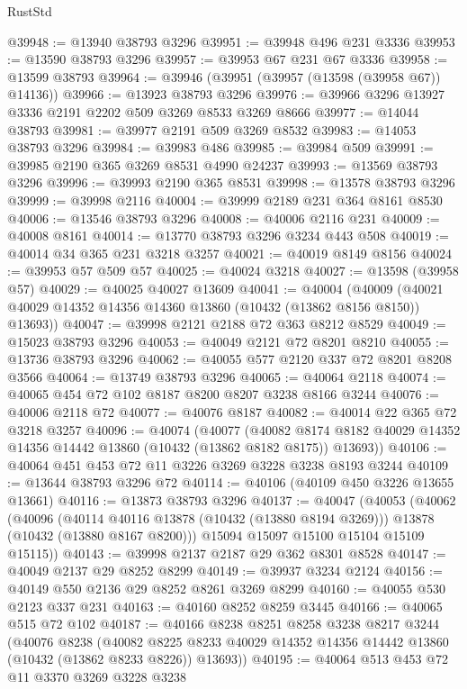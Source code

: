 \begin{lexlean}{RustStd}
\begin{coremodule}
@39948 := @13940 @38793 @3296
@39951 := @39948 @496 @231 @3336
@39953 := @13590 @38793 @3296
@39957 := @39953 @67 @231 @67 @3336
@39958 := @13599 @38793
@39964 := @39946 (@39951 (@39957 (@13598 (@39958 @67)) @14136))
@39966 := @13923 @38793 @3296
@39976 := @39966 @3296 @13927 @3336 @2191 @2202 @509 @3269 @8533 @3269 @8666
@39977 := @14044 @38793
@39981 := @39977 @2191 @509 @3269 @8532
@39983 := @14053 @38793 @3296
@39984 := @39983 @486
@39985 := @39984 @509
@39991 := @39985 @2190 @365 @3269 @8531 @4990 @24237
@39993 := @13569 @38793 @3296
@39996 := @39993 @2190 @365 @8531
@39998 := @13578 @38793 @3296
@39999 := @39998 @2116
@40004 := @39999 @2189 @231 @364 @8161 @8530
@40006 := @13546 @38793 @3296
@40008 := @40006 @2116 @231
@40009 := @40008 @8161
@40014 := @13770 @38793 @3296 @3234 @443 @508
@40019 := @40014 @34 @365 @231 @3218 @3257
@40021 := @40019 @8149 @8156
@40024 := @39953 @57 @509 @57
@40025 := @40024 @3218
@40027 := @13598 (@39958 @57)
@40029 := @40025 @40027 @13609
@40041 := @40004
    (@40009 (@40021 @40029 @14352 @14356 @14360 @13860 (@10432 (@13862 @8156 @8150)) @13693))
@40047 := @39998 @2121 @2188 @72 @363 @8212 @8529
@40049 := @15023 @38793 @3296
@40053 := @40049 @2121 @72 @8201 @8210
@40055 := @13736 @38793 @3296
@40062 := @40055 @577 @2120 @337 @72 @8201 @8208 @3566
@40064 := @13749 @38793 @3296
@40065 := @40064 @2118
@40074 := @40065 @454 @72 @102 @8187 @8200 @8207 @3238 @8166 @3244
@40076 := @40006 @2118 @72
@40077 := @40076 @8187
@40082 := @40014 @22 @365 @72 @3218 @3257
@40096 := @40074
    (@40077
      (@40082 @8174 @8182 @40029 @14352 @14356 @14442 @13860 (@10432 (@13862 @8182 @8175)) @13693))
@40106 := @40064 @451 @453 @72 @11 @3226 @3269 @3228 @3238 @8193 @3244
@40109 := @13644 @38793 @3296 @72
@40114 := @40106 (@40109 @450 @3226 @13655 @13661)
@40116 := @13873 @38793 @3296
@40137 := @40047
    (@40053
      (@40062
        (@40096
          (@40114 @40116 @13878 (@10432 (@13880 @8194 @3269)))
          @13878
          (@10432 (@13880 @8167 @8200)))
        @15094
        @15097
        @15100
        @15104
        @15109
        @15115))
@40143 := @39998 @2137 @2187 @29 @362 @8301 @8528
@40147 := @40049 @2137 @29 @8252 @8299
@40149 := @39937 @3234 @2124
@40156 := @40149 @550 @2136 @29 @8252 @8261 @3269 @8299
@40160 := @40055 @530 @2123 @337 @231
@40163 := @40160 @8252 @8259 @3445
@40166 := @40065 @515 @72 @102
@40187 := @40166
    @8238
    @8251
    @8258
    @3238
    @8217
    @3244
    (@40076
      @8238
      (@40082 @8225 @8233 @40029 @14352 @14356 @14442 @13860 (@10432 (@13862 @8233 @8226)) @13693))
@40195 := @40064 @513 @453 @72 @11 @3370 @3269 @3228 @3238

\end{coremodule}
\end{lexlean}
